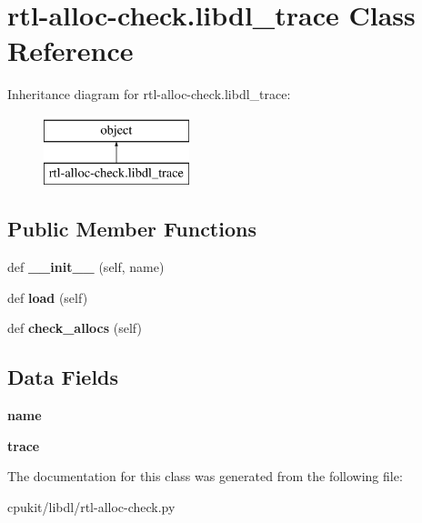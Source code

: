 \hypertarget{classrtl-alloc-check_1_1libdl__trace}{}\section{rtl-\/alloc-\/check.libdl\+\_\+trace Class Reference}
\label{classrtl-alloc-check_1_1libdl__trace}
Inheritance diagram for rtl-\/alloc-\/check.libdl\+\_\+trace\+:\begin{figure}[H]
\begin{center}
\leavevmode
\includegraphics[height=2.000000cm]{classrtl-alloc-check_1_1libdl__trace}
\end{center}
\end{figure}
\subsection*{Public Member Functions}
\begin{DoxyCompactItemize}
\item 
\mbox{\label{classrtl-alloc-check_1_1libdl__trace_ae44000d900c081de9044ad9349243c50}} 
def {\bfseries \+\_\+\+\_\+init\+\_\+\+\_\+} (self, name)
\item 
\mbox{\label{classrtl-alloc-check_1_1libdl__trace_a1d14e220817d1e1d57613c2a9f77926b}} 
def {\bfseries load} (self)
\item 
\mbox{\label{classrtl-alloc-check_1_1libdl__trace_a24a8db5ad733780a64fbf305db85a11e}} 
def {\bfseries check\+\_\+allocs} (self)
\end{DoxyCompactItemize}
\subsection*{Data Fields}
\begin{DoxyCompactItemize}
\item 
\mbox{\label{classrtl-alloc-check_1_1libdl__trace_a5fcb15d61634dced99dabef4df7290a7}} 
{\bfseries name}
\item 
\mbox{\label{classrtl-alloc-check_1_1libdl__trace_a030d666596a9f4aab06e6b7edfea993b}} 
{\bfseries trace}
\end{DoxyCompactItemize}


The documentation for this class was generated from the following file\+:\begin{DoxyCompactItemize}
\item 
cpukit/libdl/rtl-\/alloc-\/check.\+py\end{DoxyCompactItemize}
